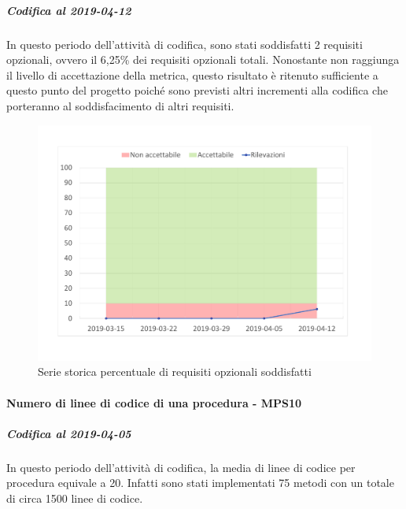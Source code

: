\subparagraph{Codifica al 2019-04-12}
In questo periodo dell'attività di codifica, sono stati soddisfatti 2 requisiti opzionali, ovvero il 6,25\% dei requisiti opzionali totali.
Nonostante non raggiunga il livello di accettazione della
metrica, questo risultato è ritenuto sufficiente a questo punto del progetto poiché sono previsti altri incrementi alla codifica che porteranno al soddisfacimento di altri requisiti.
\begin{figure}[H]
	\centering
	\includegraphics[scale=0.6]{images/resoconto/MPS9Chart.pdf}
	\caption{Serie storica percentuale di requisiti opzionali soddisfatti}	
\end{figure}

\paragraph{Numero di linee di codice di una procedura - MPS10}
\subparagraph{Codifica al 2019-04-05}
In questo periodo dell'attività di codifica, la media di linee di codice per procedura equivale a 20. Infatti sono stati implementati 75 metodi con un totale di circa 1500 linee di codice.

